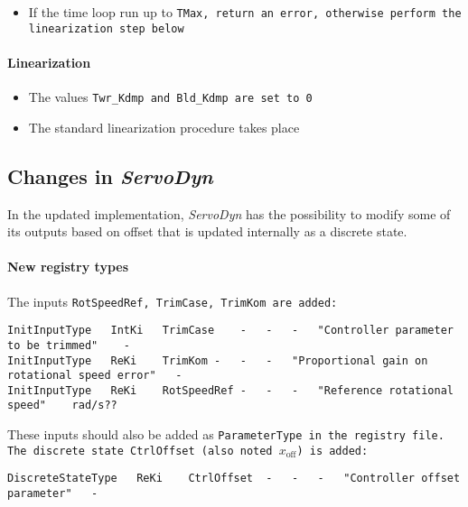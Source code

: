 \documentclass[11pt]{article}
\begin{document}
\begin{itemize}
\begin{itemize}
    \end{itemize}
    \item If the time loop run up to \tt{TMax}, return an error, otherwise perform the linearization step below
\end{itemize}
\paragraph{Linearization}
\begin{itemize}
\item The values \tt{Twr\_Kdmp} and \tt{Bld\_Kdmp} are set to 0
\item The standard linearization procedure takes place
\end{itemize}




\subsection{Changes in \textit{ServoDyn}}
\label{sec:changesservodyn}
In the updated implementation, \textit{ServoDyn} has the possibility to modify some of its outputs based on offset that is updated internally as a discrete state.

\paragraph{New registry types}
The inputs \tt{RotSpeedRef}, \tt{TrimCase}, \tt{TrimKom} are added: 
\fortran
\begin{lstlisting}
InitInputType	IntKi	TrimCase	-	-	-	"Controller parameter to be trimmed"	-
InitInputType	ReKi	TrimKom	-	-	-	"Proportional gain on rotational speed error"	-
InitInputType	ReKi	RotSpeedRef	-	-	-	"Reference rotational speed"	rad/s??
\end{lstlisting}
These inputs should also be added as \tt{ParameterType} in the registry file.
The discrete state \tt{CtrlOffset} (also noted $x_\text{off}$) is added: 
\begin{lstlisting}
DiscreteStateType	ReKi	CtrlOffset	-	-	-	"Controller offset parameter"	-
\end{lstlisting}
\end{document}
